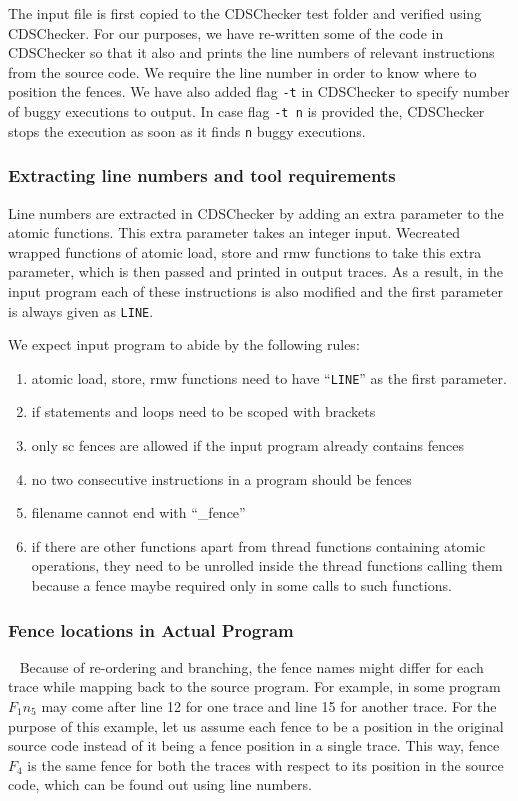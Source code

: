The input file is first copied to the CDSChecker test folder and 
verified using CDSChecker. 
For our purposes, we have re-written some of the code in CDSChecker 
so that it also and prints the line numbers of relevant instructions 
from the source code. We require the line number in order to know 
where to position the fences. We have also added flag \texttt{-t} 
in CDSChecker to specify number of buggy executions to output. In 
case flag \texttt{-t n} is provided the, CDSChecker stops the execution 
as soon as it finds \texttt{n} buggy executions.


\subsubsection{Extracting line numbers and tool requirements}
Line numbers are extracted in CDSChecker by adding an extra parameter 
to the atomic functions. This extra parameter takes an integer input. 
Wecreated wrapped functions of atomic load, store and rmw functions 
to take this extra parameter, which is then passed and printed in 
output traces. As a result, in the input program each of these 
instructions is also modified and the first parameter is always 
given as {\tt{\textunderscore\textunderscore LINE\textunderscore\textunderscore}}.

We expect input program to abide by the following rules:
\begin{enumerate}
	\item atomic load, store, rmw functions need to have 
	``{\tt{\textunderscore\textunderscore LINE\textunderscore\textunderscore}}'' 
	as the first parameter.
	\item if statements and loops need to be scoped with 
	brackets %
	\item only sc fences are allowed if the input program 
	already contains fences
	\item no two consecutive instructions in a program should be fences 
	\item filename cannot end with ``\_fence''
	\item if there are other functions apart from thread functions 
	containing atomic operations, they need to be unrolled inside the 
	thread functions calling them because a fence maybe required only 
	in some calls to such functions.
\end{enumerate}

\subsubsection{Fence locations in Actual Program}\
Because of re-ordering and branching, the fence names might 
differ for each trace while mapping back to the source program. 
For example, in some program $F_1n_5$ may come after line 12 
for one trace and line 15 for another trace. For the purpose of this 
example, let us assume each fence to be a position in the original 
source code instead of it being a fence position in a single trace. 
This way, fence $F_4$ is the same fence for both the traces 
with respect to its position in the source code, which can be found 
out using line numbers.

